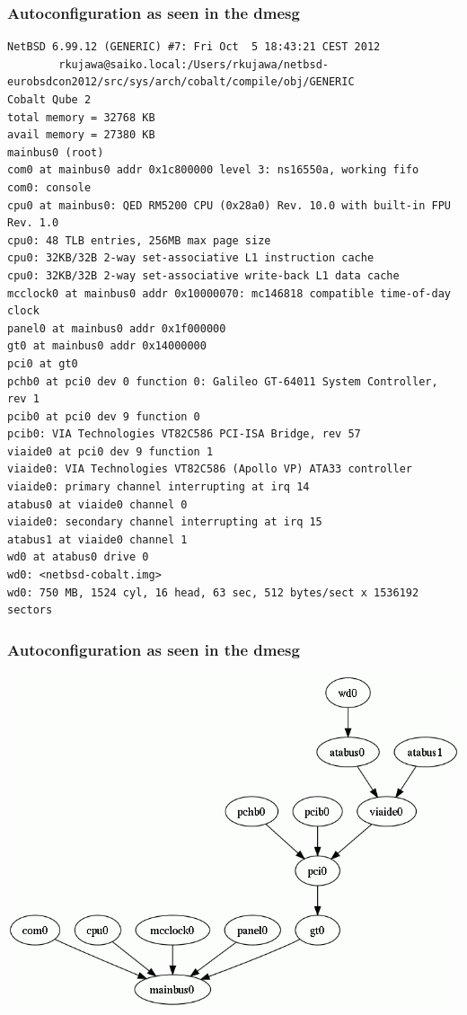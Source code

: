 \documentclass[dvipsnames,table]{beamer}
\begin{document}
\begin{frame}[fragile]
\frametitle{Autoconfiguration as seen in the dmesg}
\tiny
\begin{verbatim}
NetBSD 6.99.12 (GENERIC) #7: Fri Oct  5 18:43:21 CEST 2012
        rkujawa@saiko.local:/Users/rkujawa/netbsd-eurobsdcon2012/src/sys/arch/cobalt/compile/obj/GENERIC
Cobalt Qube 2
total memory = 32768 KB
avail memory = 27380 KB
mainbus0 (root)
com0 at mainbus0 addr 0x1c800000 level 3: ns16550a, working fifo
com0: console
cpu0 at mainbus0: QED RM5200 CPU (0x28a0) Rev. 10.0 with built-in FPU Rev. 1.0
cpu0: 48 TLB entries, 256MB max page size
cpu0: 32KB/32B 2-way set-associative L1 instruction cache
cpu0: 32KB/32B 2-way set-associative write-back L1 data cache
mcclock0 at mainbus0 addr 0x10000070: mc146818 compatible time-of-day clock
panel0 at mainbus0 addr 0x1f000000
gt0 at mainbus0 addr 0x14000000
pci0 at gt0
pchb0 at pci0 dev 0 function 0: Galileo GT-64011 System Controller, rev 1
pcib0 at pci0 dev 9 function 0
pcib0: VIA Technologies VT82C586 PCI-ISA Bridge, rev 57
viaide0 at pci0 dev 9 function 1
viaide0: VIA Technologies VT82C586 (Apollo VP) ATA33 controller
viaide0: primary channel interrupting at irq 14
atabus0 at viaide0 channel 0
viaide0: secondary channel interrupting at irq 15
atabus1 at viaide0 channel 1
wd0 at atabus0 drive 0
wd0: <netbsd-cobalt.img>
wd0: 750 MB, 1524 cyl, 16 head, 63 sec, 512 bytes/sect x 1536192 sectors\end{verbatim}
\end{frame}

\begin{frame}
\frametitle{Autoconfiguration as seen in the dmesg}
\begin{center}
\includegraphics[scale=0.4]{img_cobaltdevices.png}
\end{center}
\end{frame}
\end{document}
